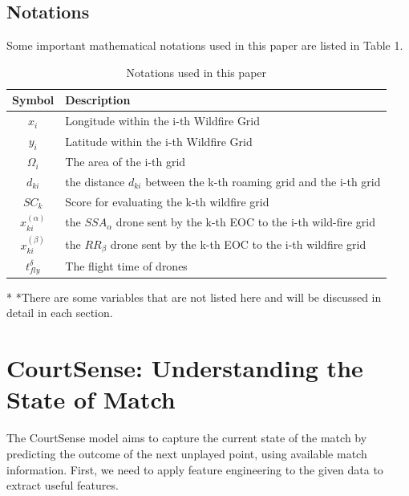 \documentclass[12pt]{article}  %
\begin{document}
\subsection{Notations}
Some important mathematical notations used in this paper are listed in Table 1. 
\begin{table}[htbp]
\begin{center}
\caption{Notations used in this paper}
\begin{tabular}{c l}
\toprule[2pt]
\multicolumn{1}{m{3cm}}{\centering Symbol} & \multicolumn{1}{m{8cm}}{\centering Description }\\
\midrule
$x_i$ & Longitude within the i-th Wildfire Grid \\
$y_i$ & Latitude within the i-th Wildfire Grid \\
$\varOmega _i$ & The area of the i-th grid\\
$d_{ki}$ & the distance $d_{ki}$ between the k-th roaming grid and the i-th grid \\
$SC_k$ & Score for evaluating the k-th wildfire grid \\
\vspace{5pt}%
$x^{( \alpha )}_{ki}$ & the $SSA_\alpha$ drone sent by the k-th EOC to the i-th wild-fire grid\\
\vspace{3pt}
$x^{( \beta )}_{ki}$ & the $RR_\beta$ drone sent by the k-th EOC to the i-th wildfire grid\\
$t_{fly}^{\delta}$ & The flight time of drones\\
\bottomrule[2pt]
\end{tabular}\label{tb:notation}
 \begin{tablenotes}
        \footnotesize
        \item[*] *There are some variables that are not listed here and will be discussed in detail in each section. %
      \end{tablenotes}
\end{center}
\end{table}
\vspace{-1cm}%






\section{CourtSense: Understanding the State of Match}
The CourtSense model aims to capture the current state of the match by predicting the outcome of the next unplayed point, using available match information. First, we need to apply feature engineering to the given data to extract useful features.
\end{document}
